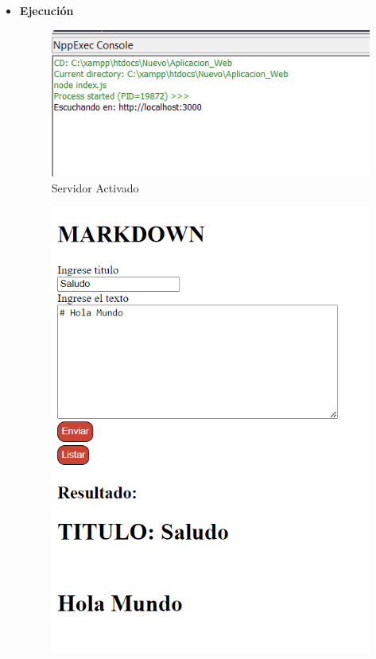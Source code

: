 \documentclass{article}
\begin{document}
\begin{itemize}
\begin{figure}[H]
		\end{figure}
		\item \textbf{Ejecución}
		\begin{figure}[H]
			\centering
			\includegraphics[width=1\textwidth,keepaspectratio]{img/web1.png}
			\caption{Servidor Activado}
		\end{figure}
		\begin{figure}[H]
			\centering
			\includegraphics[width=1\textwidth,keepaspectratio]{img/web2.png}

\end{figure}
\end{itemize}
\end{document}
